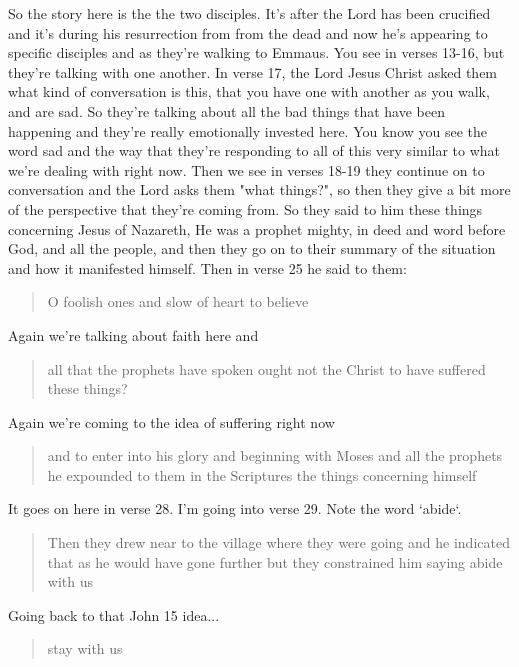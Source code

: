 \documentclass[11pt]{article} %
\begin{document}
So the story here is the the two disciples. It's after the Lord has been crucified and it's during his
resurrection from from the dead and now he's appearing to specific disciples and as they're walking
to Emmaus. You see in verses 13-16, but they're talking with one another. In verse 17, the Lord
Jesus Christ asked them what kind of conversation is this, that you have one with another as you
walk, and are sad. So they're talking about all the bad things that have been happening and they're
really emotionally invested here. You know you see the word sad and the way that they're responding
to all of this very similar to what we're dealing with right now. Then we see in verses 18-19 they
continue on to conversation and the Lord asks them "what things?", so then they give a bit more
of the perspective that they're coming from. So they said to him these things concerning Jesus of
Nazareth, He was a prophet mighty, in deed and word before God, and all the people, and then
they go on to their summary of the situation and how it manifested himself. Then in verse 25
he said to them:

\begin{quote}
O foolish ones and slow of heart to believe
\end{quote}

Again we're talking about faith here and

\begin{quote}
all that the prophets have spoken ought not the Christ to have suffered these things?
\end{quote}

Again we're coming to the idea of suffering right now

\begin{quote}
and to enter into his glory and beginning with Moses and all the prophets he expounded to
them in the Scriptures the things concerning himself
\end{quote}

It goes on here in verse 28. I'm going into verse 29. Note the word `abide`.

\begin{quote}
Then they drew near to the village where they were going and he indicated that as he would
have gone further but they constrained him saying abide with us
\end{quote}

Going back to that John 15 idea...

\begin{quote}
stay with us
\end{quote}
\end{document}
